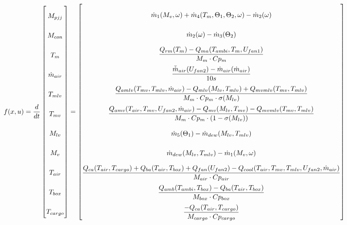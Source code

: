 \begin{equation} \label{eq:f_noSub} \renewcommand{\arraystretch}{2.4}
	f(x,u) =  \dfrac{d}{dt} \begin{bmatrix}
		M_{pjj}			\\				%
		M_{con} 		\\				%
		T_m 			\\				%
		\dot{m}_{air}	\\				%
		T_{mlv}			\\				%
		T_{mv}			\\				%
		M_{lv}			\\				%
		M_v				\\				%
		T_{air}			\\				%
		T_{box}			\\				%
		T_{cargo}		\\				%

	\end{bmatrix}
	=
	\begin{bmatrix}
		\dot{m}_1(M_{v}, \omega) + \dot{m}_4(T_m,\Theta_1,\Theta_2,\omega) - \dot{m}_2(\omega) \\										%
		\dot{m}_{2}(\omega) - \dot{m}_{3}(\Theta_2)	\\												%
		\dfrac{Q_{rm}(T_m) - Q_{ma}(T_{ambi}, T_m, U_{fan1})}{M_m \cdot Cp_m} \\									%
		\dfrac{\bar{\dot{m}}_{air}(U_{fan2})  - \dot{m}_{air}(\dot{m}_{air})} {10s}		\\					%
		\dfrac{Q_{amlv}(T_{mv},T_{mlv},\dot{m}_{air})-Q_{mlv}(M_{lv},T_{mlv}) + Q_{mvmlv}(T_{mv},T_{mlv})}{M_m \cdot Cp_m \cdot \sigma(M_{lv})}        \\	%
		\dfrac{Q_{amv}(T_{air},T_{mv},U_{fan2},\dot{m}_{air}) - Q_{mv}(M_{lv},T_{mv}) - Q_{mvmlv}(T_{mv},T_{mlv})}{M_m \cdot Cp_m \cdot (1- \sigma(M_{lv}))}	\\	%
		\dot{m}_{5}(\Theta_1) - \dot{m}_{dew}(M_{lv},T_{mlv})		\\											%
		\dot{m}_{dew}(M_{lv},T_{mlv}) - \dot{m}_1(M_{v}, \omega)	\\												%
		\dfrac{Q_{ca}(T_{air},T_{cargo}) + Q_{ba}(T_{air},T_{box}) + Q_{fan}(U_{fan2}) - Q_{cool}(T_{air},T_{mv},T_{mlv},U_{fan2},\dot{m}_{air})}{M_{air} \cdot Cp_{air}} \\		%
		\dfrac{Q_{amb}(T_{ambi},T_{box}) -  Q_{ba}(T_{air},T_{box})}{M_{box} \cdot Cp_{box}} \\							%
		\dfrac{-Q_{ca}(T_{air},T_{cargo})}{M_{cargo} \cdot Cp_{cargo}}									%
	\end{bmatrix}
\end{equation} 

